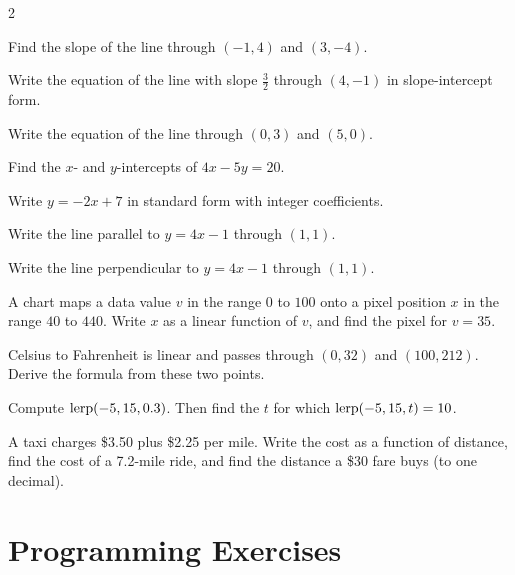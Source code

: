 \begin{multicols}{2}
\begin{exercises}
\item Find the slope of the line through $(-1, 4)$ and $(3, -4)$.
\item Write the equation of the line with slope $\tfrac{3}{2}$ through $(4, -1)$ in slope-intercept form.
\item Write the equation of the line through $(0, 3)$ and $(5, 0)$.
\item Find the $x$- and $y$-intercepts of $4x - 5y = 20$.
\item Write $y = -2x + 7$ in standard form with integer coefficients.
\item Write the line parallel to $y = 4x - 1$ through $(1, 1)$.
\item Write the line perpendicular to $y = 4x - 1$ through $(1, 1)$.
\item A chart maps a data value $v$ in the range $0$ to $100$ onto a pixel position $x$ in the range $40$ to $440$. Write $x$ as a linear function of $v$, and find the pixel for $v = 35$.
\item Celsius to Fahrenheit is linear and passes through $(0, 32)$ and $(100, 212)$. Derive the formula from these two points.
\item Compute $\operatorname{lerp}(-5, 15, 0.3)$. Then find the $t$ for which $\operatorname{lerp}(-5, 15, t) = 10$.
\item A taxi charges \$3.50 plus \$2.25 per mile. Write the cost as a function of distance, find the cost of a 7.2-mile ride, and find the distance a \$30 fare buys (to one decimal).
\end{exercises}
\end{multicols}

\section{Programming Exercises}

